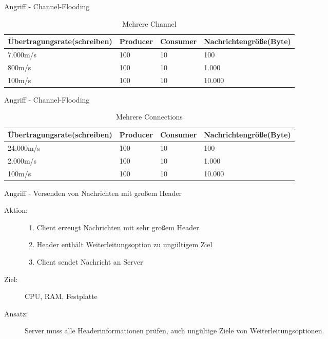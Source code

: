 \documentclass[10pt]{beamer}
\begin{document}
\begin{frame}{Angriff - Channel-Flooding}
\begin{table}[!htb]
	\centering
	\begin{tabular}{p{3cm}llp{3cm}}
		Übertragungsrate\newline (schreiben) & Producer & Consumer & Nachrichtengröße\newline (Byte) \\ \hline
		7.000m/s                             & 100      & 10       & 100                              \\
		800m/s                               & 100      & 10       & 1.000                            \\
		100m/s                               & 100      & 10       & 10.000
	\end{tabular}
	\caption{Mehrere Channel}
\end{table}
\end{frame}

\begin{frame}{Angriff - Channel-Flooding}
\begin{table}[!htb]
	\centering
	\begin{tabular}{p{3cm}llp{3cm}}
		Übertragungsrate\newline (schreiben) & Producer & Consumer & Nachrichtengröße\newline (Byte) \\ \hline
		24.000m/s                            & 100      & 10       & 100                             \\
		2.000m/s                             & 100      & 10       & 1.000                           \\
		100m/s                               & 100      & 10       & 10.000
	\end{tabular}
	\caption{Mehrere Connections}
\end{table}
\end{frame}


\begin{frame}[t]{Angriff - Versenden von Nachrichten mit großem Header}
\begin{description}
	\item[Aktion:]
		\begin{enumerate}
			\item Client erzeugt Nachrichten mit sehr großem Header
			\item Header enthält Weiterleitungsoption zu ungültigem Ziel
			\item Client sendet Nachricht an Server
		\end{enumerate} \smallskip
	\item[Ziel:] CPU, RAM, Festplatte \smallskip
	\item[Ansatz:] Server muss alle Headerinformationen prüfen, auch ungültige Ziele von Weiterleitungsoptionen. 
\end{description}
\end{frame}
\end{document}
